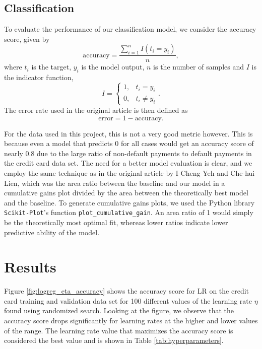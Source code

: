 \documentclass[a4paper, 11pt, twocolumn]{article}
\begin{document}
\subsection{Classification}
\label{Classification}
To evaluate the performance of our classification model, we consider the accuracy
score, given by
\begin{equation}
\label{eq:accuracy}
\text{accuracy}=\frac{\sum_{i=1}^nI(t_i=y_i)}{n},
\end{equation}
where $t_i$ is the target, $y_i$ is the model output, $n$ is the number of
samples and $I$ is the indicator function,
\[
I = \begin{cases}
1, & t_i = y_i\\
0, & t_i \neq y_i
\end{cases} .
\]
The error rate used in the original article \cite{origarticle} is then defined as
\begin{equation}
\text{error} = 1 - \text{accuracy}.
\label{error}
\end{equation}

For the data used in this project, this is not a very good metric however. This is
because even a model that predicts 0 for all cases would get an accuracy score of
nearly 0.8 due to the large ratio of non-default payments to default payments in
the credit card data set. The need for a better model evaluation is clear, and
we employ the same technique as in the original article by I-Cheng Yeh and Che-hui
Lien, which was the area ratio \cite{origarticle} between the baseline and our
model in a cumulative gains plot divided by the area between the theoretically
best model and the baseline. To generate cumulative gains plots, we used the
Python library \texttt{Scikit-Plot}'s function \texttt{plot\_cumulative\_gain}.
An area ratio of 1 would simply be the theoretically most optimal fit, whereas
lower ratios indicate lower predictive ability of the model.

\section{Results}
Figure \ref{fig:logreg_eta_accuracy} shows the accuracy score for LR on the credit
card training and validation data set for 100 different values of the learning
rate $\eta$ found using randomized search. Looking at the figure, we observe
that the accuracy  score drops significantly for learning rates at the higher
and lower values of the range. The learning rate value that maximizes the
accuracy score is considered the best value and is shown in Table
\ref{tab:hyperparameters}.
\end{document}
